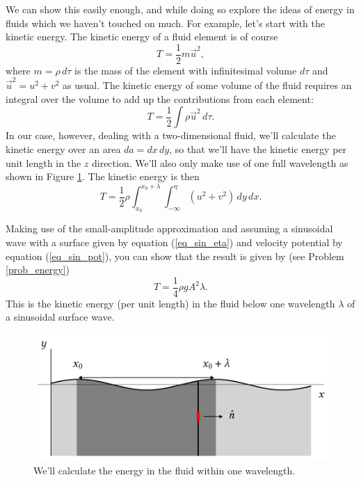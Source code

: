 We can show this easily enough, and while doing so explore the ideas of energy in fluids which we haven't touched on much.  For example, let's start with the kinetic energy.  The kinetic energy of a fluid element is of course
\[
T = \frac{1}{2} m \vec{u}^2,
\]
where $m = \rho \, d\tau$ is the mass of the element with infinitesimal volume $d\tau$ and $\vec{u}^2 = u^2 + v^2$ as usual.  The kinetic energy of some volume of the fluid requires an integral over the volume to add up the contributions from each element:
\begin{equation}
T = \frac{1}{2} \int \rho \vec{u}^2 \, d \tau.
\end{equation}
In our case, however, dealing with a two-dimensional fluid, we'll calculate the kinetic energy over an area $da = dx \, dy$, so that we'll have the kinetic energy per unit length in the $z$ direction.  We'll also only make use of one full wavelength as shown in Figure \ref{fig_wave_energy}. The kinetic energy is then
\begin{equation}
T = \frac{1}{2} \rho \int_{x_0}^{x_0 + \lambda} \int_{-\infty}^{\eta} (u^2 + v^2) \, dy \, dx.
\end{equation} 

Making use of the small-amplitude approximation and assuming a sinusoidal wave with a surface given by equation (\ref{eq_sin_eta}) and velocity potential by equation (\ref{eq_sin_pot}), you can show that the result is given by (see Problem \ref{prob_energy})
\begin{equation}
T = \frac{1}{4} \rho g A^2 \lambda.
\end{equation}
This is the kinetic energy (per unit length) in the fluid below one wavelength $\lambda$ of a sinusoidal surface wave.

\begin{figure}
\centering\includegraphics[width=0.8\linewidth]{Figures/Chapter5/fig_wave_energy}
\caption{We'll calculate the energy in the fluid within one wavelength.}
\label{fig_wave_energy}
\end{figure}

